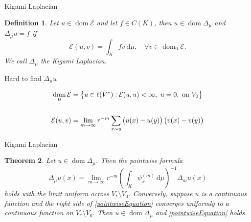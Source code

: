 \documentclass{beamer}
\newcounter{chapCount}
\newtheorem{theorems}{Theorem}[chapCount]
\newtheorem{defi}[theorems]{Definition}
\DeclareMathOperator{\dom}{dom}
\newcommand{\dd}{\ \text{d}}
\begin{document}
	\begin{frame}{Kigami Laplacian}
		\setcounter{theorems}{9}
		\vspace{3em}
		\begin{defi}
			Let $u \in \dom \mathcal{E}$ and let $f \in C(K)$, then $u \in \dom \Delta_{\mu}$ and $\Delta_{\mu} u =f$ if
			\begin{equation}
				\mathcal{E}(u,v) = \int_{K}fv \dd \mu, \quad \forall v \in \dom_{0}\mathcal{E}.
			\end{equation}
			We call $\Delta_{\mu}$ the \emph{Kigami Laplacian}.
		\end{defi}
		
		\pause
		
		\begin{description}
			\item<2->[Problem: ] Hard to find $\Delta_{\mu}u$
		\end{description}
		\begin{align}
			\dom_0 \mathcal{E} &= \cbr{u \in \ell(V^{*}) : \mathcal{E}(u, u) < \infty, \ u = 0,\text{ on } V_0 } \\ 
			&\phantom{a} \\
			\mathcal{E}(u, v) &= \lim_{m \to \infty} r^{-m}\sum_{x \sim y} \left(u(x) - u(y) \right)\left(v(x) - v(y) \right)
		\end{align}
		\end{frame}
		
		\begin{frame}{Kigami Laplacian}
			
		\setcounter{theorems}{15}
		\begin{theorems} \label{pointwiseFormula}
			Let $u \in \dom \Delta_{\mu}$. Then the pointwise formula
			\begin{equation}\label{pointwiseEquation}
				\Delta_{\mu} u(x) = \lim_{m \to \infty} r^{-m} \left(\int_{K} \psi_x^{(m)} \dd \mu \right)^{-1} \widetilde{\Delta}_m u(x)
			\end{equation}
			holds with the limit uniform across $V_* \setminus V_0$. Conversely, suppose $u$ is a continuous function and the right side of \eqref{pointwiseEquation} converges uniformly to a continuous function on $V_* \setminus V_0$. Then $u \in \dom \Delta_{\mu}$ and \eqref{pointwiseEquation} holds.
		\end{theorems}
	\end{frame}
	
\end{document}
